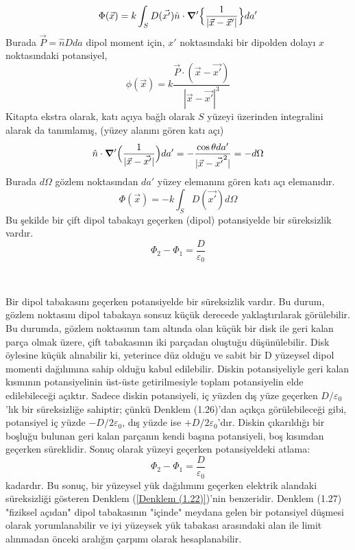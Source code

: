 \begin{theorem}
\[ \Phi (\Vec{x}) = k \int_{S} D (\Vec{x'}) \hat{n} \cdot \grad ' \Big\{ \dfrac{1}{|\Vec{x} - \Vec{x}'|} \Big\} da' \]
Burada $\Vec{P} = \hat{n} D da$ dipol moment için, $x'$ noktasındaki bir dipolden dolayı $x$ noktasındaki potansiyel,
\[ \phi (\Vec{x}) = k \dfrac{\Vec{P} \cdot (\Vec{x} - \Vec{x'})}{|\Vec{x} - \Vec{x'}|^{3}} \]
Kitapta ekstra olarak, katı açıya bağlı olarak $S$ yüzeyi üzerinden integralini alarak da tanımlamış, (yüzey alanını gören katı açı)
\[ \hat{n} \cdot \grad' \Big( \dfrac{1}{|\Vec{x} - \Vec{x'}|} \Big) da' = - \dfrac{\cos \theta da'}{|\Vec{x} - \Vec{x'}^{2}|} = -d \Omega\]
Burada $d \Omega$ gözlem noktasından $da'$ yüzey elemanını gören katı açı elemanıdır.
\[\Phi (\vec{x}) = -k \int_{S} D (\Vec{x'}) d \Omega \tag{1.26}\]
Bu şekilde bir çift dipol tabakayı geçerken (dipol) potansiyelde bir süreksizlik vardır. 
\[ \Phi_{2} - \Phi_{1} = \dfrac{D}{\varepsilon_{0}} \tag{1.27} \]
\end{theorem}

\ 

Bir dipol tabakasını geçerken potansiyelde bir süreksizlik vardır. Bu durum, gözlem noktasını dipol tabakaya sonsuz küçük derecede yaklaştırılarak görülebilir. Bu durumda, gözlem noktasının tam altında olan küçük bir disk ile geri kalan parça olmak üzere, çift tabakasının iki parçadan oluştuğu düşünülebilir. Disk öylesine küçük alınabilir ki, yeterince düz olduğu ve sabit bir D yüzeysel dipol momenti dağılımına sahip olduğu kabul edilebilir. Diskin potansiyeliyle geri kalan kısmının potansiyelinin üst-üste getirilmesiyle toplam potansiyelin elde edilebileceği açıktır. Sadece diskin potansiyeli, iç yüzden dış yüze geçerken $D/\varepsilon_{0}$'lık bir süreksizliğe sahiptir; çünkü Denklem (1.26)'dan açıkça görülebileceği gibi, potansiyel iç yüzde $-D/2\varepsilon_{0}$, dış yüzde ise  $+D/2\varepsilon_{0}$'dır. Diskin çıkarıldığı bir boşluğu bulunan geri kalan parçanın kendi başına potansiyeli, boş kısımdan geçerken süreklidir. Sonuç olarak yüzeyi geçerken potansiyeldeki atlama:
\[ \Phi_{2} - \Phi_{1} = \dfrac{D}{\varepsilon_{0}} \tag{1.27} \]
kadardır. Bu sonuç, bir yüzeysel yük dağılımını geçerken elektrik alandaki süreksizliği gösteren Denklem (\ref{Denklem (1.22)})'nin benzeridir. Denklem (1.27) "fiziksel açıdan" dipol tabakasının "içinde" meydana gelen bir potansiyel düşmesi olarak yorumlanabilir ve iyi yüzeysek yük tabakası arasındaki alan ile limit alınmadan önceki aralığın çarpımı olarak hesaplanabilir.
\newpage
